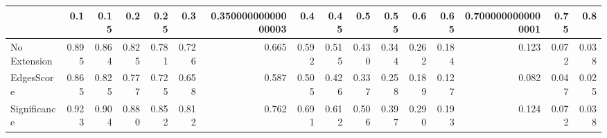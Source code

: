 \begin{tabular}{lrrrrrrrrrrrrrrr}
\toprule
{} &   0.1 &  0.15 &   0.2 &  0.25 &   0.3 & 0.35000000000000003 &   0.4 &  0.45 &   0.5 &  0.55 &   0.6 &  0.65 & 0.7000000000000001 &  0.75 &   0.8 \\
\midrule
No Extension & 0.895 & 0.864 & 0.825 & 0.781 & 0.726 &               0.665 & 0.592 & 0.515 & 0.430 & 0.344 & 0.262 & 0.184 &              0.123 & 0.072 & 0.038 \\
EdgesScore   & 0.865 & 0.825 & 0.777 & 0.725 & 0.658 &               0.587 & 0.505 & 0.426 & 0.337 & 0.258 & 0.189 & 0.127 &              0.082 & 0.047 & 0.025 \\
Significance & 0.923 & 0.904 & 0.880 & 0.852 & 0.812 &               0.762 & 0.691 & 0.612 & 0.506 & 0.397 & 0.290 & 0.193 &              0.124 & 0.072 & 0.038 \\
\bottomrule
\end{tabular}
